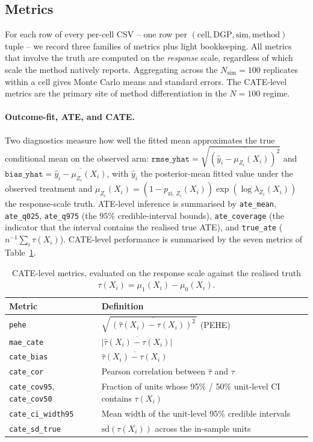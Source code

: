 \documentclass[11pt]{article}
\theoremstyle{plain}
\theoremstyle{definition}
\theoremstyle{remark}
\newcommand{\muone}{\mu_{1}}
\newcommand{\muzero}{\mu_{0}}
\newcommand{\tauresp}{\tau}                 %
\newcommand{\pzi}[1][z]{p_{\mathrm{zi},\,#1}}
\begin{document}
\subsection{Metrics}\label{sec:method-metrics}

For each row of every per-cell CSV -- one row per
$(\text{cell}, \text{DGP}, \text{sim}, \text{method})$ tuple -- we
record three families of metrics plus light bookkeeping. All metrics
that involve the truth are computed on the \emph{response} scale,
regardless of which scale the method natively reports. Aggregating
across the $N_{\mathrm{sim}} = 100$ replicates within a cell gives
Monte Carlo means and standard errors. The CATE-level metrics are
the primary site of method differentiation in the $N = 100$ regime.

\paragraph{Outcome-fit, ATE, and CATE.}
Two diagnostics measure how well the fitted mean approximates the
true conditional mean on the observed arm:
$\mathtt{rmse\_yhat} = \sqrt{\overline{(\widehat y_i - \mu_{Z_i}(X_i))^2}}$
and $\mathtt{bias\_yhat} = \overline{\widehat y_i - \mu_{Z_i}(X_i)}$,
with $\widehat y_i$ the posterior-mean fitted value under the
observed treatment and $\mu_{Z_i}(X_i) = (1 - \pzi[Z_i](X_i))
\exp(\log\lambda_{Z_i}(X_i))$ the response-scale truth. ATE-level
inference is summarised by \verb|ate_mean|, \verb|ate_q025|,
\verb|ate_q975| (the $95\%$ credible-interval bounds),
\verb|ate_coverage| (the indicator that the interval contains the
realised true ATE), and \verb|true_ate|
($n^{-1}\sum_i \tauresp(X_i)$). CATE-level performance is summarised
by the seven metrics of Table~\ref{tab:method-metrics-cate}.

\begin{table}[t]
\centering
\caption{CATE-level metrics, evaluated on the response scale against
the realised truth $\tau(X_i) = \muone(X_i) - \muzero(X_i)$.}
\label{tab:method-metrics-cate}
\begin{tabular}{ll}
\toprule
Metric & Definition \\
\midrule
\verb|pehe| &
  $\sqrt{\,\overline{(\widehat\tau(X_i) - \tau(X_i))^{2}}\,}$ (PEHE) \\
\verb|mae_cate| &
  $\overline{\lvert \widehat\tau(X_i) - \tau(X_i) \rvert}$ \\
\verb|cate_bias| &
  $\overline{\widehat\tau(X_i) - \tau(X_i)}$ \\
\verb|cate_cor| &
  Pearson correlation between $\widehat\tau$ and $\tau$ \\
\verb|cate_cov95|, \verb|cate_cov50| &
  Fraction of units whose 95\% / 50\% unit-level CI contains $\tau(X_i)$ \\
\verb|cate_ci_width95| &
  Mean width of the unit-level 95\% credible intervals \\
\verb|cate_sd_true| &
  $\mathrm{sd}(\tau(X_i))$ across the in-sample units \\
\bottomrule
\end{tabular}
\end{table}
\end{document}
